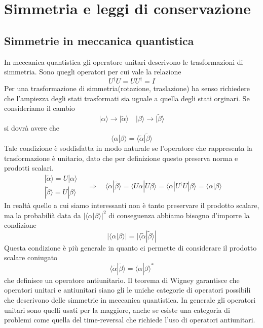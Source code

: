 \section{Simmetria e leggi di conservazione}

\subsection{Simmetrie in meccanica quantistica}

In meccanica quantistica gli operatore unitari descrivono le trasformazioni di simmetria. Sono quegli operatori per cui vale la relazione 
\begin{equation*}
	U^{\dag}U = UU^{\dag}  = I
\end{equation*} 
 Per una trasformazione di simmetria(rotazione, traslazione) ha senso richiedere che l'ampiezza degli stati trasformati sia uguale a quella degli stati orginari. Se consideriamo il cambio
 \begin{equation*}
 	|\alpha \rangle \to |\tilde{\alpha} \rangle  \quad |\beta \rangle \to |\tilde{\beta} \rangle
 \end{equation*}
 si dovr\`a avere che 
 \begin{equation*}
 	\langle \alpha | \beta \rangle = \langle \tilde{\alpha}|\tilde{\beta} \rangle
 \end{equation*}
Tale condizione \`e soddisfatta in modo naturale se l'operatore che rappresenta la trasformazione \`e unitario, dato che per definizione questo preserva norma e prodotti scalari.
\begin{equation*}
	\begin{array}{l}
		|\tilde{\alpha} \rangle = U|\alpha\rangle \\
		|\tilde{\beta} \rangle = U |\beta \rangle 
	\end{array}
	\quad \Rightarrow \quad \langle \tilde{\alpha}|\tilde{\beta} \rangle = \langle U \alpha |U\beta \rangle = \langle \alpha |U^{\dag}U|\beta \rangle = \langle \alpha|\beta \rangle
\end{equation*} 
In realt\`a quello a cui siamo interessanti non \`e tanto preservare il prodotto scalare, ma la probabili\`a data da $|\langle \alpha |\beta \rangle|^2$ di conseguenza abbiamo bisogno d'imporre la condizione 
\begin{equation*}
	|\langle \alpha |\beta \rangle | = | \langle \tilde{\alpha}|\tilde{\beta}\rangle|
\end{equation*} 
Questa condizione \`e pi\`u generale in quanto ci permette di considerare il prodotto scalare coniugato
\begin{equation*}
	\langle \tilde{\alpha}|\tilde{\beta} \rangle = \langle \alpha |\beta \rangle^*
\end{equation*}
che definisce un operatore antiunitario. Il teorema di Wigney garantisce che operatori unitari e antiunitari siano gli le uniche categorie di operatori possibili che descrivono delle simmetrie in meccanica quantistica.  In generale gli operatori unitari sono quelli usati per la maggiore, anche se esiste una categoria di problemi come quella del time-reversal che richiede l'uso di operatori antiunitari.

